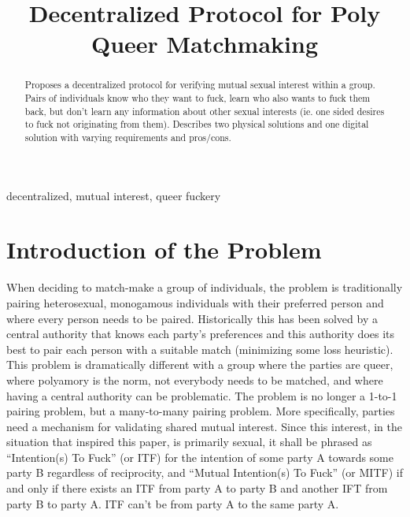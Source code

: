 \documentclass[conference]{IEEEtran}
\begin{document}
\title{Decentralized Protocol for Poly Queer Matchmaking}

\author{
}

\maketitle

\begin{abstract}
Proposes a decentralized protocol for verifying mutual sexual interest within a group. Pairs of individuals know who they want to fuck, learn who also wants to fuck them back, but don't learn any information about other sexual interests (ie. one sided desires to fuck not originating from them). Describes two physical solutions and one digital solution with varying requirements and pros/cons.
\end{abstract}

\begin{IEEEkeywords}
decentralized, mutual interest, queer fuckery
\end{IEEEkeywords}

\section{Introduction of the Problem}
When deciding to match-make a group of individuals, the problem is traditionally pairing heterosexual, monogamous individuals with their preferred person and where every person needs to be paired. Historically this has been solved by a central authority that knows each party's preferences and this authority does its best to pair each person with a suitable match (minimizing some loss heuristic). This problem is dramatically different with a group where the parties are queer, where polyamory is the norm, not everybody needs to be matched, and where having a central authority can be problematic. The problem is no longer a 1-to-1 pairing problem, but a many-to-many pairing problem. More specifically, parties need a mechanism for validating shared mutual interest. Since this interest, in the situation that inspired this paper, is primarily sexual, it shall be phrased as “Intention(s) To Fuck” (or ITF) for the intention of some party A towards some party B regardless of reciprocity, and “Mutual Intention(s) To Fuck” (or MITF) if and only if there exists an ITF from party A to party B and another IFT from party B to party A. ITF can’t be from party A to the same party A.
\end{document}
